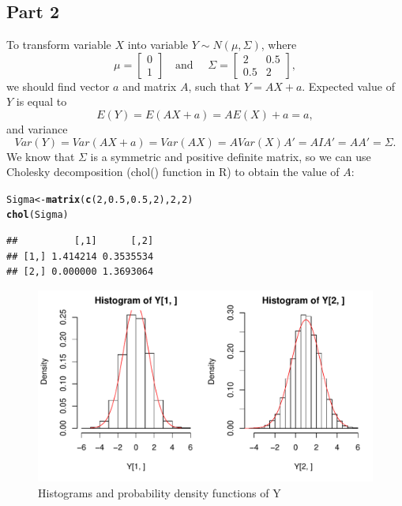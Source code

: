 \documentclass[12pt, a4paper]{article}\usepackage[]{graphicx}\usepackage[]{color}
\makeatletter
\def\maxwidth{ %
  \ifdim\Gin@nat@width>\linewidth
    \linewidth
  \else
    \Gin@nat@width
  \fi
}
\newcommand{\hlnum}[1]{\textcolor[rgb]{0.686,0.059,0.569}{#1}}%
\newcommand{\hlstd}[1]{\textcolor[rgb]{0.345,0.345,0.345}{#1}}%
\newcommand{\hlkwb}[1]{\textcolor[rgb]{0.69,0.353,0.396}{#1}}%
\newcommand{\hlkwd}[1]{\textcolor[rgb]{0.737,0.353,0.396}{\textbf{#1}}}%
\newenvironment{kframe}{%
 \def\at@end@of@kframe{}%
 \ifinner\ifhmode%
  \def\at@end@of@kframe{\end{minipage}}%
  \begin{minipage}{\columnwidth}%
 \fi\fi%
 \def\FrameCommand##1{\hskip\@totalleftmargin \hskip-\fboxsep
 \colorbox{shadecolor}{##1}\hskip-\fboxsep
     \hskip-\linewidth \hskip-\@totalleftmargin \hskip\columnwidth}%
 \MakeFramed {\advance\hsize-\width
   \@totalleftmargin\z@ \linewidth\hsize
   \@setminipage}}%
 {\par\unskip\endMakeFramed%
 \at@end@of@kframe}
\newenvironment{knitrout}{}{} %
\makeatother
\begin{document}
\subsection{Part 2}
To transform variable $X$ into variable $Y \sim N(\mu, \Sigma)$, where 
\[\mu = \left[
    \begin{matrix}  
      0 \\
      1
    \end{matrix} 
    \right]
  \quad \text{and }\quad 
  \Sigma = \left[
    \begin{matrix}  
      2   & 0.5 \\
      0.5 & 2
    \end{matrix} 
    \right],
\]
we should find vector $a$ and matrix $A$, such that $Y=A X + a$. 
Expected value of $Y$ is equal to
\[E(Y) = E(AX+a) = A E(X)+a = a, \]
and variance
\[Var(Y) = Var(AX+a) = Var(AX) = A Var(X) A' = A I A' = A A' = \Sigma. \]
We know that $\Sigma$ is a symmetric and positive definite matrix, so we can use Cholesky decomposition (chol() function in R) to obtain the value of $A$:
\begin{knitrout}
\color{fgcolor}\begin{kframe}
\begin{alltt}
\hlstd{Sigma} \hlkwb{<-} \hlkwd{matrix}\hlstd{(}\hlkwd{c}\hlstd{(}\hlnum{2}\hlstd{,} \hlnum{0.5}\hlstd{,} \hlnum{0.5}\hlstd{,} \hlnum{2}\hlstd{),} \hlnum{2}\hlstd{,} \hlnum{2}\hlstd{)}
\hlkwd{chol}\hlstd{(Sigma)}
\end{alltt}
\begin{verbatim}
##          [,1]      [,2]
## [1,] 1.414214 0.3535534
## [2,] 0.000000 1.3693064
\end{verbatim}
\end{kframe}
\end{knitrout}

\begin{knitrout}
\color{fgcolor}\begin{figure}[H]

{\centering \includegraphics[width=\maxwidth]{figure/ex2checkDistrY2-1} 

}

\caption[Histograms and probability density functions of Y]{Histograms and probability density functions of Y}\label{fig:ex2checkDistrY2}
\end{figure}


\end{knitrout}
\end{document}
